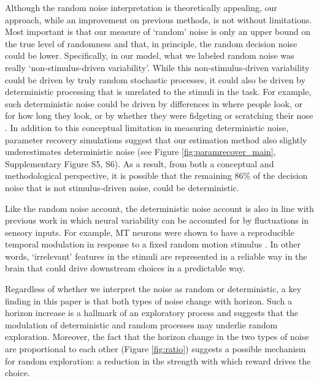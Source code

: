 \documentclass[12pt]{article}
\begin{document}
{Although the random noise interpretation is theoretically appealing, our approach, while an improvement on previous methods, is not without limitations. Most important is that our measure of `random' noise is only an upper bound on the true level of randomness and that, in principle, the random decision noise could be lower. Specifically, in our model, what we labeled random noise was really `non-stimulus-driven variability'. While this non-stimulus-driven variability could be driven by truly random stochastic processes, it could also be driven by deterministic processing that is unrelated to the stimuli in the task. For example, such deterministic noise could be driven by differences in where people look, or for how long they look, or by whether they were fidgeting or scratching their nose \citep{Musall2019}.  In addition to this conceptual limitation in measuring deterministic noise, parameter recovery simulations suggest that our estimation method also slightly underestimates deterministic noise (see Figure \ref{fig:paramrecover_main}, Supplementary Figure S5, S6). As a result, from both a conceptual and methodological perspective, it is possible that the remaining 86\% of the decision noise that is not stimulus-driven noise, could be deterministic.

Like the random noise account, the deterministic noise account is also in line with previous work in which neural variability can be accounted for by fluctuations in sensory inputs. For example, MT neurons were shown to have a reproducible temporal modulation in response to a fixed random motion stimulus \citep{Bair1996}. In other words, `irrelevant' features in the stimuli are represented in a reliable way in the brain that could drive downstream choices in a predictable way. 


Regardless of whether we interpret the noise as random or deterministic, a key finding in this paper is that both types of noise change with horizon. Such a horizon increase is a hallmark of an exploratory process and suggests that the modulation of deterministic and random processes may underlie random exploration. Moreover, the fact that the horizon change in the two types of noise are proportional to each other (Figure \ref{fig:ratio}) suggests a possible mechanism for random exploration: a reduction in the strength with which reward drives the choice. 

}
\end{document}
